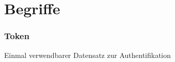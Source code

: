 \section{Begriffe}
\begin{frame}
	\frametitle{Token}
	\vspace{1cm}
	Einmal verwendbarer Datensatz zur Authentifikation
\end{frame}

